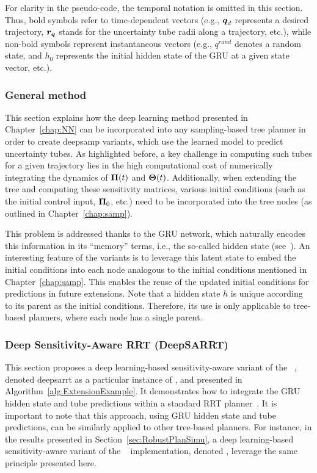For clarity in the pseudo-code, the temporal notation is omitted in this section. 
Thus, bold symbols refer to time-dependent vectors (e.g., $\boldsymbol{q}_d$ represents a desired trajectory, $\boldsymbol{r_q}$ stands for the uncertainty tube radii along a trajectory, etc.), while non-bold symbols represent instantaneous vectors (e.g., $q^{rand}$ denotes a random state, and $h_0$ represents the initial hidden state of the GRU at a given state vector, etc.).

\subsubsection{General method}

This section explains how the deep learning method presented in Chapter~\ref{chap:NN} can be incorporated into any sampling-based tree planner in order to create \gls{deepsamp} variants, which use the learned model to predict uncertainty tubes.
As highlighted before, a key challenge in computing such tubes for a given trajectory lies in the high computational cost of numerically integrating the dynamics of $\boldsymbol{\Pi}(t)$ and $\boldsymbol{\Theta}(t)$.
Additionally, when extending the tree and computing these sensitivity matrices, various initial conditions (such as the initial control input, $\boldsymbol{\Pi}_0$, etc.) need to be incorporated into the tree nodes (as outlined in Chapter~\ref{chap:samp}).

This problem is addressed thanks to the GRU network, which naturally encodes this information in its ``memory'' terms, i.e., the so-called hidden state (see~\cite{cGRU}).
An interesting feature of the  variants is to leverage this latent state to embed the initial conditions into each node analogous to the  initial conditions mentioned in Chapter~\ref{chap:samp}. 
This enables the reuse of the updated initial conditions for predictions in future extensions.
Note that a hidden state $h$ is unique according to its parent as the  initial conditions.
Therefore, its use is only applicable to tree-based planners, where each node has a single parent.

\subsubsection{Deep Sensitivity-Aware RRT (DeepSARRT)}

This section proposes a deep learning-based sensitivity-aware variant of the ~\cite{cRRT}, denoted \gls{deepsarrt} as a particular instance of , and presented in Algorithm~\ref{alg:ExtensionExample}. 
It demonstrates how to integrate the GRU hidden state and tube predictions within a standard RRT planner~\cite{cRRT}.
It is important to note that this approach, using GRU hidden state and tube predictions, can be similarly applied to other tree-based planners. 
For instance, in the results presented in Section~\ref{sec:RobustPlanSimu}, a deep learning-based sensitivity-aware variant of the ~\cite{cRRTstar} implementation, denoted , leverage the same principle presented here.

